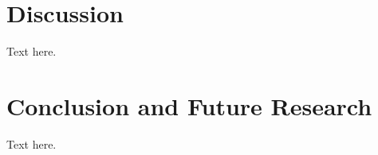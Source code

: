 \documentclass{article}
\begin{document}
\section{Discussion}


Text here.

\section{Conclusion and Future Research}

Text here.




\end{document}
